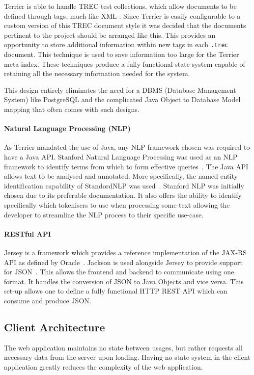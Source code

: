 \documentclass{l4proj}
\newcommand{\code}[1]{\texttt{#1}}
\begin{document}
Terrier is able to handle TREC test collections, which allow documents to be defined through tags, much like XML \cite{trecnist}.
Since Terrier is easily configurable to a custom version of this TREC document style it was decided that the documents pertinent to the project should be arranged like this.
This provides an opportunity to store additional information within new tags in each \code{.trec} document. This technique is used to save information too large for the Terrier meta-index.
These techniques produce a fully functional state system capable of retaining all the necessary information needed for the system.

This design entirely eliminates the need for a DBMS (Database Management System) like PostgreSQL and the complicated Java Object to Database Model mapping that often comes with such designs.

\paragraph{Natural Language Processing (NLP)}
As Terrier mandated the use of Java, any NLP framework chosen was required to have a Java API.
Stanford Natural Language Processing was used as an NLP framework to identify terms from which to form effective queries~\cite{manning-EtAl:2014:P14-5}. The Java API allows text to be analysed and annotated. More specifically, the named entity identification capability of StandordNLP was used~\cite{finkel2005incorporating}.
Stanford NLP was initially chosen due to its preferable documentation. It also offers the ability to identify specifically which tokenisers to use when processing some text allowing the developer to streamline the NLP process to their specific use-case.

\paragraph{RESTful API}
Jersey is a framework which provides a reference implementation of the JAX-RS API as defined by Oracle~\cite{jersey,jaxrsapi}.
Jackson is used alongside Jersey to provide support for JSON~\cite{jackson}. This allows the frontend and backend to communicate using one format. It handles the conversion of JSON to Java Objects and vice versa.
This set-up allows one to define a fully functional HTTP REST API which can consume and produce JSON.

\subsection{Client Architecture}
The web application maintains no state between usages, but rather requests all necessary data from the server upon loading. Having no state system in the client application greatly reduces the complexity of the web application.
\end{document}
